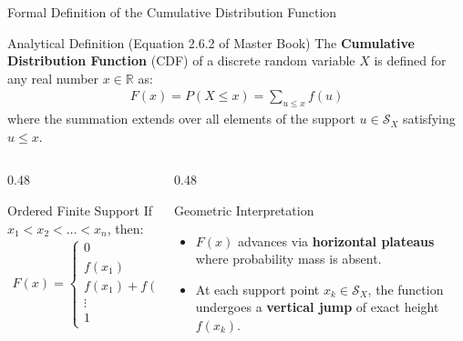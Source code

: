 \documentclass[aspectratio=169,xcolor={dvipsnames,table}]{beamer}
\begin{document}
\begin{frame}{Formal Definition of the Cumulative Distribution Function}
	\begin{block}{Analytical Definition (Equation 2.6.2 of Master Book)}
		\scriptsize
		The \textbf{Cumulative Distribution Function} (CDF) of a discrete random variable $X$ is defined for any real number $x \in \mathbb{R}$ as:
		\vspace{-0.15cm}
		\begin{align*}
			F(x) = P(X \le x) = \sum_{u \le x} f(u)
		\end{align*}
		\vspace{-0.25cm}
		where the summation extends over all elements of the support $u \in \mathcal{S}_X$ satisfying $u \le x$.
	\end{block}
	\vspace{-0.4cm}
	\begin{columns}[T]
		\begin{column}{0.48\textwidth}
			\begin{exampleblock}{Ordered Finite Support}
				\scriptsize
				If $x_1 < x_2 < \dots < x_n$, then:
				\vspace{-0.15cm}
				\begin{align*}
					F(x) = \begin{cases}
						0 & x < x_1 \\
						f(x_1) & x_1 \le x < x_2 \\
						f(x_1) + f(x_2) & x_2 \le x < x_3 \\
						\vdots & \vdots \\
						1 & x \ge x_n
					\end{cases}
				\end{align*}
			\end{exampleblock}
		\end{column}
		\begin{column}{0.48\textwidth}
			\begin{alertblock}{Geometric Interpretation}
				\scriptsize
				\begin{itemize}
					\itemsep=0.02cm
					\item $F(x)$ advances via \textbf{horizontal plateaus} where probability mass is absent.
					\item At each support point $x_k \in \mathcal{S}_X$, the function undergoes a \textbf{vertical jump} of exact height $f(x_k)$.
				\end{itemize}
			\end{alertblock}
		\end{column}
	\end{columns}
\end{frame}
\end{document}
